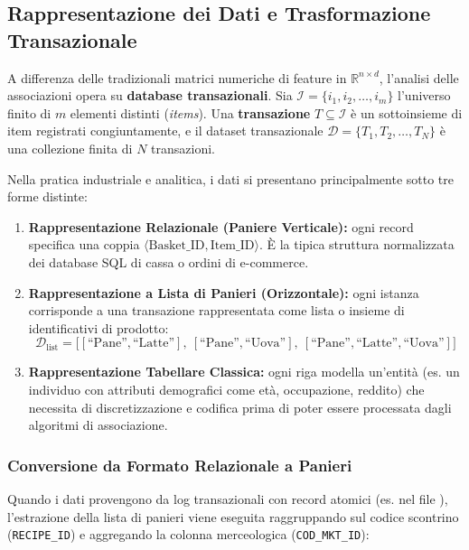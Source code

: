 \FloatBarrier
\subsection{Rappresentazione dei Dati e Trasformazione Transazionale}
\label{subsec:lab-data-representation}

A differenza delle tradizionali matrici numeriche di feature in $\mathbb{R}^{n \times d}$, l'analisi delle associazioni opera su \textbf{database transazionali}. Sia $\mathcal{I} = \{i_1, i_2, \dots, i_m\}$ l'universo finito di $m$ elementi distinti (\textit{items}). Una \textbf{transazione} $T \subseteq \mathcal{I}$ è un sottoinsieme di item registrati congiuntamente, e il dataset transazionale $\mathcal{D} = \{T_1, T_2, \dots, T_N\}$ è una collezione finita di $N$ transazioni.

Nella pratica industriale e analitica, i dati si presentano principalmente sotto tre forme distinte:
\begin{enumerate}
    \item \textbf{Rappresentazione Relazionale (Paniere Verticale):} ogni record specifica una coppia $\langle \text{Basket\_ID}, \text{Item\_ID} \rangle$. È la tipica struttura normalizzata dei database SQL di cassa o ordini di e-commerce.
    \item \textbf{Rappresentazione a Lista di Panieri (Orizzontale):} ogni istanza corrisponde a una transazione rappresentata come lista o insieme di identificativi di prodotto:
    \begin{equation}
        \mathcal{D}_{\text{list}} = \big[ [\text{``Pane''}, \text{``Latte''}],\ [\text{``Pane''}, \text{``Uova''}],\ [\text{``Pane''}, \text{``Latte''}, \text{``Uova''}] \big]
    \end{equation}
    \item \textbf{Rappresentazione Tabellare Classica:} ogni riga modella un'entità (es. un individuo con attributi demografici come età, occupazione, reddito) che necessita di discretizzazione e codifica prima di poter essere processata dagli algoritmi di associazione.
\end{enumerate}

\subsubsection{Conversione da Formato Relazionale a Panieri}
Quando i dati provengono da log transazionali con record atomici (es. nel file ), l'estrazione della lista di panieri viene eseguita raggruppando sul codice scontrino (\texttt{RECIPE\_ID}) e aggregando la colonna merceologica (\texttt{COD\_MKT\_ID}):

